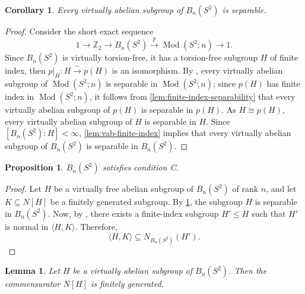 \documentclass[a4paper,12pt,leqno]{amsart}
\newtheorem{proposition}[theorem]{Proposition}
\newtheorem{corollary}[theorem]{Corollary}
\newtheorem{lemma}[theorem]{Lemma}
\theoremstyle{definition}
\newcommand{\Z}{\mathbb{Z}}
\DeclareMathOperator{\mcg}{Mod}
\begin{document}
\begin{corollary}\label{separable:sphere:braid}
    Every virtually abelian subgroup of $B_n(S^2)$ is separable.
\end{corollary}
\begin{proof}
Consider the short exact sequence
\[
  1 \to \Z_2 \to B_n(S^2) \xrightarrow{p} \mcg(S^2;n) \to 1.
\]
Since $B_n(S^2)$ is virtually torsion-free, it has a torsion-free
subgroup $H$ of finite index, then $p|_H \colon H \xrightarrow{\;\sim\;} p(H)$ is an isomorphism.
By \cite[Theorem 1.1]{LM07}, every virtually abelian subgroup of $\mcg(S^2;n)$
is separable in $\mcg(S^2;n)$; since $p(H)$ has finite index in $ \mcg(S^2;n)$, it follows from \cref{lem:finite-index-separability} that every virtually abelian subgroup of $p(H)$ is separable in $p(H)$. As $H \cong p(H)$, every virtually abelian subgroup of
$H$ is separable in $H$. Since $[B_n(S^2):H] < \infty$,
\cref{lem:vab-finite-index} implies that every virtually abelian
subgroup of $B_n(S^2)$ is separable in $B_n(S^2)$.
\end{proof}


\begin{proposition}\label{sphere:braid:conditionC}
  $B_n(S^2)$ satisfies condition C.
\end{proposition}

\begin{proof}
Let $H$ be a virtually free abelian subgroup of $B_n(S^2)$ of rank $n$, and let $K\subseteq N[H]$ be a finitely generated subgroup. By \cref{separable:sphere:braid}, the subgroup $H$ is separable in $B_n(S^2)$. Now, by \cite[Corollary~9]{CKRW20}, there exists a finite-index subgroup
\(H'\leq H\) such that \(H'\) is normal in \(\langle H,K\rangle\). Therefore,
\[
\langle H,K\rangle \subseteq N_{B_n(S^2)}(H').
\]
\end{proof}

\begin{lemma}\label{abelinan:subgroup:sphere:comm:fg}
Let \(H\) be a virtually abelian subgroup of \(B_n(S^2)\). Then the commensurator \(N[H]\) is finitely generated.
\end{lemma}
\end{document}

